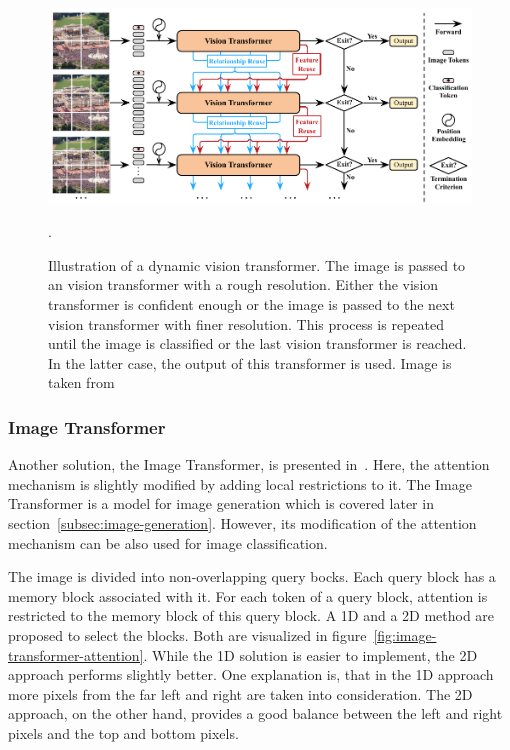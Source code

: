 \documentclass[a4paper]{scrartcl}
\begin{document}
    \begin{figure}[btp]
        \centering
        \includegraphics[width=0.85\linewidth]{img/DynamicVisionTransformer}
        \caption[Dynamic Vision Transformer]{
            Illustration of a dynamic vision transformer.
            The image is passed to an vision transformer with a rough resolution.
            Either the vision transformer is confident enough or the image is passed to the next vision transformer with finer resolution.
            This process is repeated until the image is classified or the last vision transformer is reached.
            In the latter case, the output of this transformer is used.
            Image is taken from~\cite{wang2021images}}.
        \label{fig:dynamic-vision-transformer}
    \end{figure}

    \subsubsection{Image Transformer}\label{subsubsec:image-transformer}
    Another solution, the Image Transformer, is presented in~\cite{parmar2018image}.
    Here, the attention mechanism is slightly modified by adding local restrictions to it.
    The Image Transformer is a model for image generation which is covered later in section~\ref{subsec:image-generation}.
    However, its modification of the attention mechanism can be also used for image classification.

    The image is divided into non-overlapping query bocks.
    Each query block has a memory block associated with it.
    For each token of a query block, attention is restricted to the memory block of this query block.
    A 1D and a 2D method are proposed to select the blocks.
    Both are visualized in figure~\ref{fig:image-transformer-attention}.
    While the 1D solution is easier to implement, the 2D approach performs slightly better.
    One explanation is, that in the 1D approach more pixels from the far left and right are taken into consideration.
    The 2D approach, on the other hand, provides a good balance between the left and right pixels and the top and bottom pixels.
\end{document}
